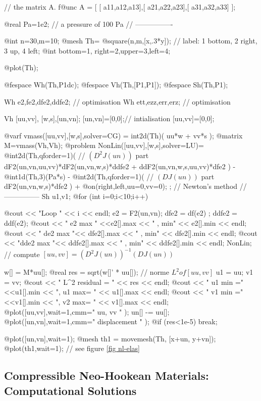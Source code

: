 \documentclass[a4paper,twoside,12pt]{book}
\begin{document}
// the matrix A.
f@unc A = [ [ a11,a12,a13],[ a21,a22,a23],[ a31,a32,a33] ];

@real Pa=1e2; //  a pressure of 100 Pa
// ----------------\hfilll

@int n=30,m=10;
@mesh Th= @square(n,m,[x,.3*y]); // label: 1 bottom, 2 right, 3 up, 4 left;
@int bottom=1, right=2,upper=3,left=4;

@plot(Th);



@fespace Wh(Th,P1dc);
@fespace Vh(Th,[P1,P1]);
@fespace Sh(Th,P1);





Wh e2,fe2,dfe2,ddfe2; // optimisation
Wh ett,ezz,err,erz; // optimisation

Vh [uu,vv], [w,s],[un,vn];
[un,vn]=[0,0];//  intialisation
[uu,vv]=[0,0];

@varf vmass([uu,vv],[w,s],solver=CG) =  int2d(Th)( uu*w + vv*s );
@matrix M=vmass(Vh,Vh);
@problem NonLin([uu,vv],[w,s],solver=LU)=
 @int2d(Th,qforder=1)( // $(D^2 J(un))$ part
                       dF2(un,vn,uu,vv)*dF2(un,vn,w,s)*ddfe2
                    +  ddF2(un,vn,w,s,uu,vv)*dfe2
	            )
   - @int1d(Th,3)(Pa*s)
   - @int2d(Th,qforder=1)( // $(D J(un))$ part
           dF2(un,vn,w,s)*dfe2   )
   + @on(right,left,uu=0,vv=0);
;
// Newton's method
// ---------------
Sh u1,v1;
@for (int i=0;i<10;i++)
{
  @cout << "Loop " << i << endl;
  e2 = F2(un,vn);
  dfe2 = df(e2) ;
  ddfe2 = ddf(e2);
  @cout << "  e2 max " <<e2[].max << " , min" << e2[].min << endl;
  @cout << " de2 max "<< dfe2[].max << " , min" << dfe2[].min << endl;
  @cout << "dde2 max "<< ddfe2[].max << " , min" << ddfe2[].min << endl;
  NonLin; //  compute $[uu,vv] = (D^2 J(un))^{-1}(D J(un))$

  w[]   = M*uu[];
  @real res = sqrt(w[]' * uu[]); //  norme  $L^2 of [uu,vv]$
  u1 = uu;
  v1 = vv;
  @cout << " L^2 residual = " << res << endl;
  @cout << " u1 min =" <<u1[].min << ", u1 max= " << u1[].max << endl;
  @cout << " v1 min =" <<v1[].min << ", v2 max= " << v1[].max << endl;
  @plot([uu,vv],wait=1,cmm=" uu, vv " );
  un[] -= uu[];
  @plot([un,vn],wait=1,cmm=" displacement " );
  @if (res<1e-5) break;
}

@plot([un,vn],wait=1);
@mesh th1 = movemesh(Th, [x+un, y+vn]);
@plot(th1,wait=1); //  see figure \ref{fig nl-elas}
\eFF

\subsection{Compressible Neo-Hookean Materials: Computational Solutions}
\end{document}
